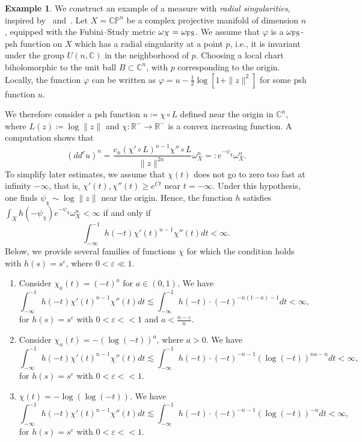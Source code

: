 \documentclass[a4paper,11pt]{amsart}
\numberwithin{equation}{section}
\theoremstyle{definition}
\newtheorem{example}[theorem]{Example}
\newcommand{\ddc}{dd^c}
\begin{document}
\begin{example} We construct an example of a measure with \emph{radial singularities}, inspired by~\cite[Section 1.3]{di2021finite} and~\cite[Section 5]{guedj2025-diameter}.
Let $X=\mathbb C\mathbb P^n$ be a complex projective manifold of dimension $n$, equipped with
the Fubini--Study metric $\omega_X=\omega_{\rm FS}$. We assume that ${\varphi}$ is a $\omega_{\rm FS}$-psh function on $X$ which has a radial singularity at a point $p$, i.e., it is invariant under the group $U(n,\mathbb C)$ in the neighborhood of $p$. Choosing a local chart biholomorphic to the unit ball $B\subset \mathbb{C}^n$, with $p$ corresponding to the origin. Locally, the function $\varphi$ can be written as $\varphi=u-\frac{1}{2}\log[1+\|z\|^2]$ for some psh function $u$.

We therefore consider a psh function $u\coloneqq\chi\circ L$ defined near the origin in $\mathbb C^n$, where $L(z)\coloneqq\log \|z\|$ and $\chi\colon\mathbb R^-\to \mathbb R^- $ is a convex increasing function. A computation shows that
\[ (\ddc u)^n=\frac{c_n (\chi'\circ L)^{n-1}\chi''\circ L}{\|z\|^{2n}}\omega_X^n=\colon e^{-\psi_\chi}\omega_X^n. \]
To simplify later estimates, we assume that $\chi(t)$ does not go to zero too fast at infinity $-\infty$, that is, $\chi'(t),\chi''(t)\geq e^{Ct}$ near $t=-\infty$. Under this hypothesis, one finds $\psi_\chi\sim \log\|z\|$ near the origin. Hence,
the function $h$ satisfies $\int_X h(-\psi_\chi)e^{-\psi_\chi}\omega_X^n<\infty $ if and only if
\[\int_{-\infty}^{-1} h(-t)\chi'(t)^{n-1}\chi''(t)dt<\infty.\]
Below, we provide several families of functions $\chi$ for which the condition holds with $h(s)=s^\varepsilon$, where $0<\varepsilon\ll 1$.
\begin{enumerate}
    \item Consider $\chi_a(t)=(-t)^a$ for $a\in (0,1)$.  We have
    \[\int_{-\infty}^{-1}h(-t)\chi'(t)^{n-1}\chi''(t)dt\lesssim\int_{-\infty}^{-1} h(-t)\cdot (-t)^{-n(1-a)-1}dt<\infty, \]
    for $h(s)=s^\varepsilon$ with $0<\varepsilon<<1$ and $a<\frac{n-\varepsilon}{n}$.
    \item Consider $\chi_a(t)=-(\log (-t))^a$, where $a>0$. We have 
  \[\int_{-\infty}^{-1}h(-t)\chi'(t)^{n-1}\chi''(t)dt\lesssim\int_{-\infty}^{-1} h(-t)\cdot (-t)^{-n-1}(\log(-t))^{na-n}dt<\infty,\]
  for $h(s)=s^\varepsilon$ with $0<\varepsilon<<1$.
  \item $\chi(t)=-\log(\log(-t))$. We have
  \[\int_{-\infty}^{-1}h(-t)\chi'(t)^{n-1}\chi''(t)dt\lesssim\int_{-\infty}^{-1} h(-t)\cdot (-t)^{-n-1}(\log(-t))^{-n}dt<\infty,\]
   for $h(s)=s^\varepsilon$ with $0<\varepsilon<<1$.
\end{enumerate}
\end{example}
\end{document}
